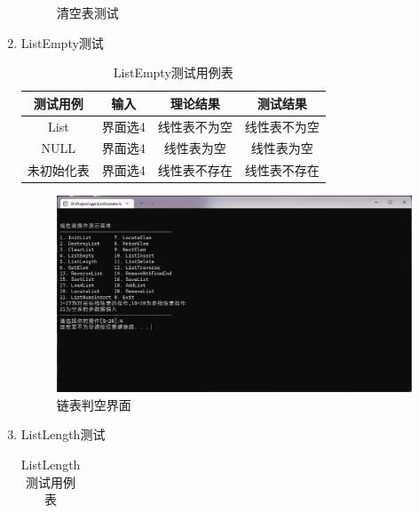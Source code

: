 \documentclass[supercite]{HustGraduPaper}
\theoremstyle{definition}
\begin{document}
\begin{enumerate}
\begin{figure}[htb]
		      \caption{清空表测试}
	      \end{figure}
	      \newpage
	\item ListEmpty测试
	      \begin{table}[htb]
		      \begin{center}
			      \setlength{\tabcolsep}{2.0mm}
			      \caption{ListEmpty测试用例表}
			      \label{table3}
			      \begin{tabular}{|c|c|c|c|}
				      \hline
				      测试用例   & 输入    & 理论结果     & 测试结果     \\
				      \hline
				      \hline
				      List       & 界面选4 & 线性表不为空 & 线性表不为空 \\
				      \hline
				      NULL       & 界面选4 & 线性表为空   & 线性表为空   \\
				      \hline
				      未初始化表 & 界面选4 & 线性表不存在 & 线性表不存在 \\
				      \hline
			      \end{tabular}
		      \end{center}
	      \end{table}
	      \begin{figure}[htb] %
		      \begin{center}
			      \includegraphics[scale=0.5]{images/p1-2.png}
			      \caption{链表判空界面}
			      \label{fig1-2}
		      \end{center}
	      \end{figure}
	\item ListLength测试
	      \begin{table}[htb]
		      \begin{center}
			      \setlength{\tabcolsep}{2.0mm}
			      \caption{ListLength测试用例表}
			      \label{table4}
			      \begin{tabular}{|c|c|c|c|}

\end{tabular}
\end{center}
\end{table}
\end{enumerate}
\end{document}
